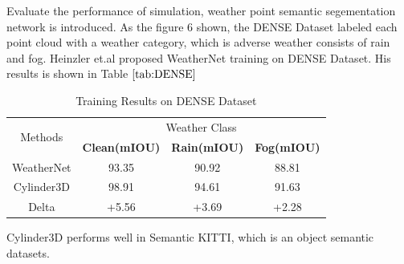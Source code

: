  
 Evaluate the performance of simulation, weather point semantic segementation network is introduced. As the figure 6 shown, the DENSE\cite{DENSE} Dataset labeled each point cloud with a weather category, which is adverse weather consists of rain and fog. Heinzler et.al \cite{heinzler_cnn-based_2020} proposed WeatherNet training on DENSE Dataset. His results is shown in Table \(\ref{tab:DENSE}\)
 \begin{table}[h!]
  \begin{center}

    \begin{tabular}{|c|c|c|c|} %
      \hline
      \multirow{2}{*}{Methods} & \multicolumn{3}{c|}{Weather Class}\\
    \cline{2-4}
       &\textbf{Clean(mIOU)} & \textbf{Rain(mIOU)}& \textbf{Fog(mIOU)}\\
      \hline
      WeatherNet & 93.35 & 90.92&88.81\\
      Cylinder3D & 98.91 & 94.61&91.63\\
      \color{blue}
      Delta & \color{blue}+5.56 & \color{blue}+3.69&\color{blue}+2.28\\
    \hline
    \end{tabular}
    \caption{Training Results on DENSE Dataset}
  \end{center}
    \label{tab:DENSE}
\end{table}
Cylinder3D\cite{zhu_cylindrical_2020} performs well in Semantic KITTI\cite{behley_semantickitti_2019}, which is an object semantic datasets. 

